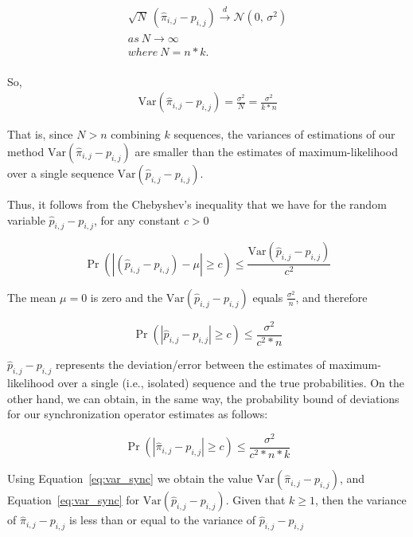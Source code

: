 \begin{equation}
\begin{aligned}
\label{eq:lim_dist2}
\sqrt{N}\ (\hat{\pi}_{i,j} - {p}_{i,j}) \xrightarrow{d} \mathcal{N}(0,\,\sigma^{2})\\
as\ N \xrightarrow{} \infty\\
where\ N = n*k .\\
\end{aligned}
\end{equation}

So, 
\begin{equation}
\begin{aligned}
\label{eq:var_sync}
 \mathrm{Var} (\hat{\pi}_{i,j} - {p}_{i,j}) = \frac {\sigma^{2}}{N} =  \frac {\sigma^{2}}{k*n}
\end{aligned}
\end{equation}


That is, since $N > n$ combining $k$ sequences, the variances of estimations of our method  $\mathrm{Var} (\hat{\pi}_{i,j} - {p}_{i,j})$ are smaller than the estimates of maximum-likelihood over a single sequence $\mathrm{Var} (\hat{p}_{i,j} - {p}_{i,j})$. 
\par Thus, it follows from the  Chebyshev's inequality \cite{feller1968introduction} that we have for the random variable $\hat{p}_{i,j} - {p}_{i,j}$, for any constant $c > 0$  

\[ \Pr\left( |(\hat{p}_{i,j} - {p}_{i,j}) - \mu| \geq c \right) \leq
\frac{\mathrm{Var} (\hat{p}_{i,j} - {p}_{i,j})}{c^2} \]


 The mean $\mu=0$ is zero and the $\mathrm{Var} (\hat{p}_{i,j} - {p}_{i,j})$ equals  $\frac {\sigma^{2}}{n}$, and therefore 
 
 \[ \Pr\left( |\hat{p}_{i,j} - {p}_{i,j}| \geq c \right) \leq
 \frac{\sigma^{2}}{c^2 * n} \]
 
 
$\hat{p}_{i,j} - {p}_{i,j}$  represents the deviation/error between the estimates of maximum-likelihood over a single (i.e., isolated) sequence and the true probabilities. On the other hand, we can obtain, in the same way, the probability bound of deviations for our synchronization operator estimates as follows:

\[ \Pr\left( |\hat{\pi}_{i,j} - {p}_{i,j}| \geq c \right) \leq
\frac{\sigma^{2}}{c^2* n*k} \]


\par Using Equation~\ref{eq:var_sync} we obtain the value $\mathrm{Var} (\hat{\pi}_{i,j} - {p}_{i,j})$, and Equation~\ref{eq:var_sync} for $\mathrm{Var} (\hat{p}_{i,j} - {p}_{i,j})$. Given that $k \ge 1$, then  the variance of $\hat{\pi}_{i,j} - {p}_{i,j}$  is less than or equal to the variance of $\hat{p}_{i,j} - {p}_{i,j}$

